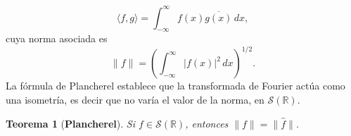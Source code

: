 \documentclass[12pt]{article}
\newcommand{\Sc}{\mathcal{S}(\mathbb{R})}
\theoremstyle{plain}
\newtheorem{teorema}{Teorema}[section] %
\theoremstyle{definition}
\numberwithin{equation}{section}
\begin{document}
            \begin{equation*}
                \langle f, g \rangle = \int_{-\infty}^{\infty} f(x)\overline{g(x)} \,dx,
            \end{equation*}
            cuya norma asociada es
            \begin{equation*}
                \lVert f \rVert = \left( \int_{-\infty}^{\infty} \left\lvert f(x) \right\rvert^2 \,dx \right)^{1/2}.
            \end{equation*}
            La fórmula de Plancherel establece que la transformada de Fourier actúa como una isometría, es decir que no varía el valor de la norma, en \(\Sc\).
            \begin{teorema}[\textbf{Plancherel}]
                Si \(f \in \Sc\), entonces \(\lVert f \rVert = \lVert \hat{f} \rVert\).
            \end{teorema}
\end{document}

